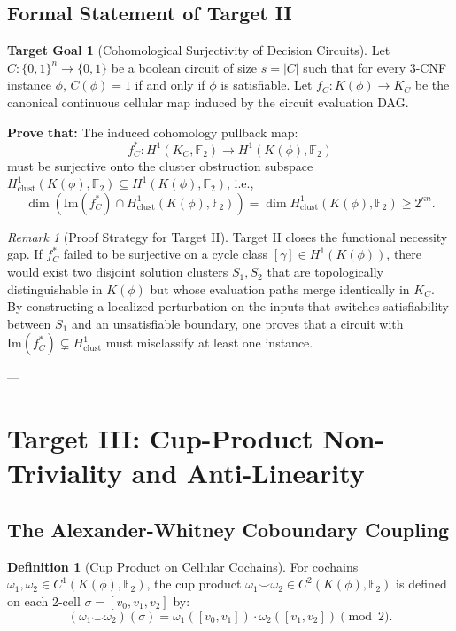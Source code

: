 \documentclass[11pt,a4paper]{article}
\theoremstyle{plain}
\theoremstyle{definition}
\newtheorem{definition}[theorem]{Definition}
\newtheorem{target}{Target Goal}[section]
\theoremstyle{remark}
\newtheorem{remark}[theorem]{Remark}
\newcommand{\Img}{\mathrm{Im}}
\begin{document}
\subsection{Formal Statement of Target II}

\begin{target}[Cohomological Surjectivity of Decision Circuits]\label{target:2}
Let $C: \{0,1\}^n \to \{0,1\}$ be a boolean circuit of size $s = |C|$ such that for every 3-CNF instance $\phi$, $C(\phi) = 1$ if and only if $\phi$ is satisfiable. Let $f_C: K(\phi) \to K_C$ be the canonical continuous cellular map induced by the circuit evaluation DAG.

\textbf{Prove that:}
The induced cohomology pullback map:
\[
f_C^*: H^1(K_C, \mathbb{F}_2) \longrightarrow H^1(K(\phi), \mathbb{F}_2)
\]
must be surjective onto the cluster obstruction subspace $H^1_{\mathrm{clust}}(K(\phi), \mathbb{F}_2) \subseteq H^1(K(\phi), \mathbb{F}_2)$, i.e.,
\[
\dim\left( \Img(f_C^*) \cap H^1_{\mathrm{clust}}(K(\phi), \mathbb{F}_2) \right) = \dim H^1_{\mathrm{clust}}(K(\phi), \mathbb{F}_2) \ge 2^{\kappa n}.
\]
\end{target}

\begin{remark}[Proof Strategy for Target II]
Target II closes the functional necessity gap. If $f_C^*$ failed to be surjective on a cycle class $[\gamma] \in H^1(K(\phi))$, there would exist two disjoint solution clusters $S_1, S_2$ that are topologically distinguishable in $K(\phi)$ but whose evaluation paths merge identically in $K_C$. By constructing a localized perturbation on the inputs that switches satisfiability between $S_1$ and an unsatisfiable boundary, one proves that a circuit with $\Img(f_C^*) \subsetneq H^1_{\mathrm{clust}}$ must misclassify at least one instance.
\end{remark}

---

\section{Target III: Cup-Product Non-Triviality and Anti-Linearity}

\subsection{The Alexander-Whitney Coboundary Coupling}

\begin{definition}[Cup Product on Cellular Cochains]
For cochains $\omega_1, \omega_2 \in C^1(K(\phi), \mathbb{F}_2)$, the cup product $\omega_1 \smile \omega_2 \in C^2(K(\phi), \mathbb{F}_2)$ is defined on each 2-cell $\sigma = [v_0, v_1, v_2]$ by:
\[
(\omega_1 \smile \omega_2)(\sigma) = \omega_1([v_0, v_1]) \cdot \omega_2([v_1, v_2]) \pmod 2.
\]
\end{definition}
\end{document}
